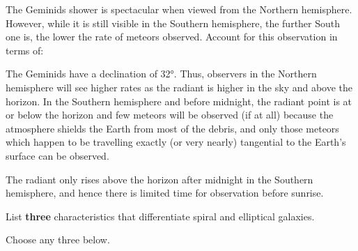 \documentclass[a4paper,11pt,draft]{exam}
\begin{document}
\begin{questions}
\question
	The Geminids shower is spectacular when viewed from the Northern hemisphere. However, while it is still visible in the Southern hemisphere, the further South one is, the lower the rate of meteors observed. Account for this observation in terms of:

\begin{solution}
	The Geminids have a declination of \ang{+32}. Thus, observers in the Northern hemisphere will see higher rates as the radiant is higher in the sky and above the horizon. In the Southern hemisphere and before midnight, the radiant point is at or below the horizon and few meteors will be observed (if at all) because the atmosphere shields the Earth from most of the debris, and only those meteors which happen to be travelling exactly (or very nearly) tangential to the Earth's surface can be observed. 
	
	The radiant only rises above the horizon after midnight in the Southern hemisphere, and hence there is limited time for observation before sunrise.
\end{solution}
	
\question[3]
	List \textbf{three} characteristics that differentiate spiral and elliptical galaxies.
	\droppoints
	\begin{solution}
		Choose any three below.
		

\end{solution}
\end{questions}
\end{document}
